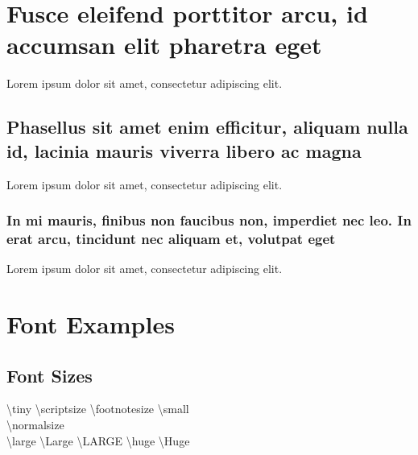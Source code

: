 \documentclass[
	a4paper, %
	12pt, %
]{CSSullivanBusinessReport}
\begin{document}
\section[Short version of long section title]{Fusce eleifend porttitor arcu, id accumsan elit pharetra eget} %

Lorem ipsum dolor sit amet, consectetur adipiscing elit. 

\subsection[Short version of long subsection title]{Phasellus sit amet enim efficitur, aliquam nulla id, lacinia mauris viverra libero ac magna}

Lorem ipsum dolor sit amet, consectetur adipiscing elit.

\subsubsection{In mi mauris, finibus non faucibus non, imperdiet nec leo. In erat arcu, tincidunt nec aliquam et, volutpat eget}

Lorem ipsum dolor sit amet, consectetur adipiscing elit.


\section{Font Examples}

\subsection{Font Sizes}

{\tiny \textbackslash tiny} {\scriptsize \textbackslash scriptsize} {\footnotesize \textbackslash footnotesize} {\small \textbackslash small}\\
{\normalsize \textbackslash normalsize}\\
{\large \textbackslash large} {\Large \textbackslash Large} {\LARGE \textbackslash LARGE} {\huge \textbackslash huge} {\Huge \textbackslash Huge}
\end{document}
